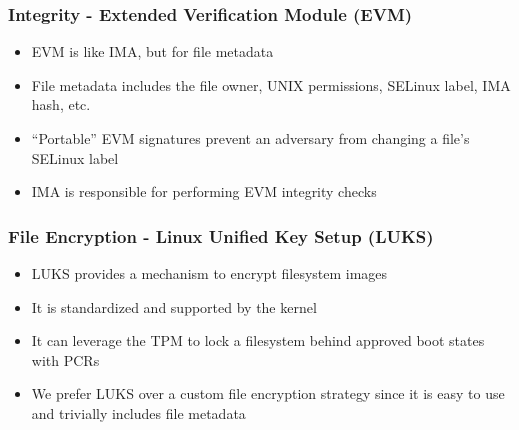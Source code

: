 \documentclass[
  notes,
]{beamer}
\begin{document}
\begin{frame}
  \frametitle{Integrity - Extended Verification Module (EVM)}

  \begin{itemize}
    \item EVM is like IMA, but for file metadata
    \item File metadata includes the file owner, UNIX permissions, SELinux label, IMA hash, etc.
    \item ``Portable'' EVM signatures prevent an adversary from changing a file's SELinux label
    \item IMA is responsible for performing EVM integrity checks
  \end{itemize}
\end{frame}
\begin{NoHyper}
\end{NoHyper}

\begin{frame}
  \frametitle{File Encryption - Linux Unified Key Setup (LUKS)}

  \begin{itemize}
    \item LUKS provides a mechanism to encrypt filesystem images
    \item It is standardized and supported by the kernel
    \item It can leverage the TPM to lock a filesystem behind approved boot states with PCRs
    \item We prefer LUKS over a custom file encryption strategy since it is easy to use and trivially includes file metadata
  \end{itemize}
\end{frame}
\begin{NoHyper}
\end{NoHyper}
\end{document}
